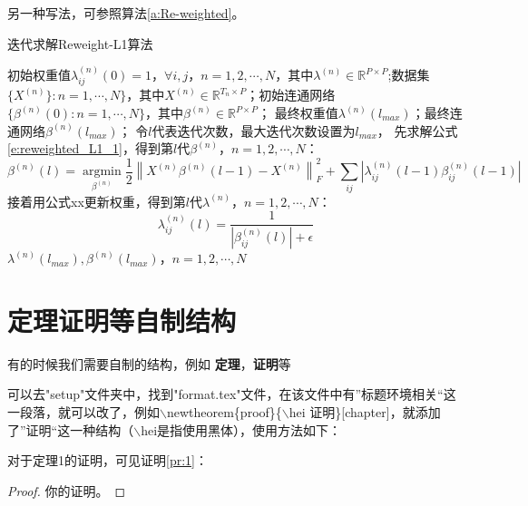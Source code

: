 另一种写法，可参照算法\ref{a:Re-weighted}。
\begin{algorithm}
  \caption{迭代求解Reweight-L1算法}
  \label{a:Re-weighted}
  \begin{algorithmic}[1] %
    \Require 初始权重值$\lambda_{ij}^{(n)}(0)=1$，$\forall i,j$，$n=1,2,\cdots,N$，其中$\lambda^{(n)}\in\mathbb{R}^{P \times P}$;数据集$\{X^{(n)}\} : n=1,\cdots,N\}$，其中$X^{(n)}\in\mathbb{R}^{T_n \times P}$；初始连通网络$\{\beta^{(n)}(0) : n=1,\cdots,N\}$，其中$\beta^{(n)}\in\mathbb{R}^{P \times P}$；
    \Ensure 最终权重值$\lambda^{(n)}(l_{max})$；最终连通网络$\beta^{(n)}(l_{max})$；
      \State 令$l$代表迭代次数，最大迭代次数设置为$l_{max}$，
        \State 先求解公式\ref{e:reweighted_L1_1}，得到第$l$代$\beta^{(n)}$，$n=1,2,\cdots,N$：
        \begin{equation}
          \label{e:reweighted_L1_1}
        \beta^{(n)}(l)=\underset{\beta^{(n)}}{\operatorname{argmin}}\frac{1}{2}\left\|X^{(n)}\beta^{(n)}(l-1)-X^{(n)}\right\|_F^2+\sum_{ij}\left|\lambda^{(n)}_{ij}(l-1)\beta^{(n)}_{ij}(l-1)\right|
        \end{equation}
        \State 接着用公式xx更新权重，得到第$l$代$\lambda^{(n)}$，$n=1,2,\cdots,N$：
        \begin{equation}
          \label{e:reweighted_L1_2}
        \lambda^{(n)}_{ij}(l)=\frac{1}{|\beta_{ij}^{(n)}(l)|+\epsilon}
        \end{equation}
      \EndWhile
      \State \Return $\lambda^{(n)}(l_{max}),\beta^{(n)}(l_{max})$，$n=1,2,\cdots,N$
    \EndFunction
  \end{algorithmic}
\end{algorithm}

\section{定理证明等自制结构}

有的时候我们需要自制的结构，例如 \textbf{定理}，\textbf{证明}等

可以去"setup"文件夹中，找到"format.tex"文件，在该文件中有”标题环境相关“这一段落，就可以改了，例如$\backslash$newtheorem\{proof\}\{$\backslash$hei 证明\}[chapter]，就添加了”证明“这一种结构（$\backslash$hei是指使用黑体），使用方法如下：

对于定理1的证明，可见证明\ref{pr:1}：
\begin{proof}
  \label{pr:1}
你的证明。
\end{proof}

